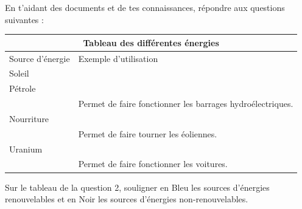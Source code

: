 \documentclass[11pt]{article}
\begin{document}
\vspace{5pt}
En t’aidant des documents et de tes connaissances, répondre aux questions suivantes :
\begin{question}
\end{question}

\newpage
\begin{question}

	\renewcommand{\arraystretch}{2.5}
	\begin{tabular}{ |p{9cm}|p{9cm}|  }
		\hline
		\multicolumn{2}{|c|}{Tableau des différentes énergies} \\
		\hline
		Source d'énergie & Exemple d'utilisation \\
		\hline
		Soleil  	&  	\\
		\hline
		Pétrole 	&  	\\
		\hline
		 			&  Permet de faire fonctionner les barrages hydroélectriques. \\
		\hline
		Nourriture  &  	\\
		\hline
		 			&  Permet de faire tourner les éoliennes.	\\
		\hline
		Uranium 	&  	\\
		\hline
		 			&  Permet de faire fonctionner les voitures.  \\
		\hline
		\end{tabular}

	\begin{subquestion}
		{Sur le tableau de la question 2, 
		souligner en Bleu les sources d’énergies renouvelables et 
		en Noir les sources d’énergies non-renouvelables.}
	\end{subquestion}		
\end{question}


\begin{question}
	\end{question}
\end{document}

